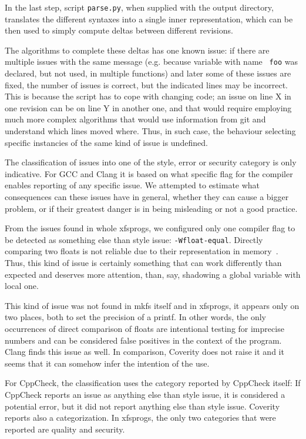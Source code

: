 In the last step, script {\tt parse.py}, when supplied with the output
directory, translates the different syntaxes into a single inner
representation, which can be then used to simply compute deltas between
different revisions.

The algorithms to complete these deltas has one known issue: if there are
multiple issues with the same message (e.g. because variable with name {\tt
				       foo} was declared, but not used, in
				       multiple functions) and later some of
these issues are fixed, the number of issues is correct, but the indicated
lines may be incorrect. This is because the script has to cope with changing
code; an issue on line X in one revision can be on line Y in another one, and
that would require employing much more complex algorithms that would use
information from git and understand which lines moved where. Thus, in such
case, the behaviour selecting specific instancies of the same kind of issue is
undefined.


The classification of issues into one of the style, error or security category
is only indicative. For GCC and Clang it is based on what specific flag for the
compiler enables reporting of any specific issue. We attempted to estimate what
consequences can these issues have in general, whether they can cause a bigger
problem, or if their greatest danger is in being misleading or not a good
practice.

From the issues found in whole xfsprogs, we configured only one compiler flag
to be detected as something else than style issue: {\tt -Wfloat-equal}.
Directly comparing two floats is not reliable due to their representation
in memory~\cite{floatsComparing}. Thus, this kind of issue is certainly
something that can work differently than expected and deserves more
attention, than, say, shadowing a global variable with local one.

This kind of issue was not found in mkfs itself and in xfsprogs, it appears
only on two places, both to set the precision of a printf. In other words,
the only occurrences of direct comparison of floats are intentional testing
for imprecise numbers and can be considered false positives in the context
of the program. Clang finds this issue as well. In comparison, Coverity
does not raise it and it seems that it can somehow infer the intention of
the use.

For CppCheck, the classification uses the category reported by CppCheck itself:
If CppCheck reports an issue as anything else than style issue, it is
considered a potential error, but it did not report anything else than style
issue. Coverity reports also a categorization. In xfsprogs, the only two
categories that were reported are quality and security.

